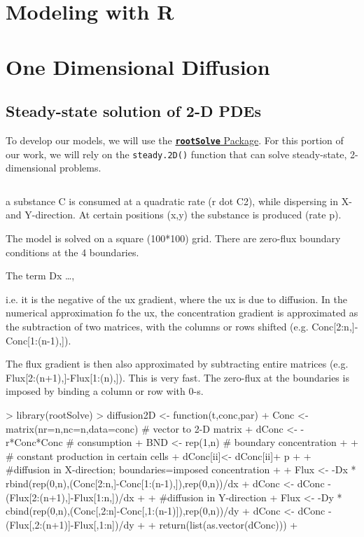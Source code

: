 \documentclass{article}
\begin{document}
\section{Modeling with R}

\section{One Dimensional Diffusion}


\subsection{Steady-state solution of 2-D PDEs}

To develop our models, we will use the \href{https://cran.r-project.org/web/packages/rootSolve/vignettes/rootSolve.pdf}{\texttt{\textbf{rootSolve}} Package}. For this portion of our work, we will rely on the \texttt{steady.2D()} function that can solve steady-state, 2-dimensional problems.

\begin{equation}
\end{equation}

a substance C is consumed at a quadratic rate (r dot C2), while dispersing in X- and Y-direction.
At certain positions (x,y) the substance is produced (rate p).

The model is solved on a square (100*100) grid. There are zero-flux boundary conditions at
the 4 boundaries.

The term Dx \ldots, 

i.e. it is the negative of the 
ux gradient, where the ux is due to diffusion. In the numerical approximation fo the 
ux, the concentration gradient is approximated as the subtraction of two matrices, with the columns or rows shifted (e.g. Conc[2:n,]-Conc[1:(n-1),]).

The flux gradient is then also approximated by subtracting entire matrices (e.g. Flux[2:(n+1),]-Flux[1:(n),]). This is very fast. The zero-flux at the boundaries is imposed by binding a column or row with 0-s.


\begin{Schunk}
\begin{Sinput}
> library(rootSolve)
> diffusion2D <- function(t,conc,par){
+ Conc <- matrix(nr=n,nc=n,data=conc) # vector to 2-D matrix
+ dConc <- -r*Conc*Conc # consumption
+ BND <- rep(1,n) # boundary concentration
+ 
+ # constant production in certain cells
+ dConc[ii]<- dConc[ii]+ p
+ 
+ #diffusion in X-direction; boundaries=imposed concentration
+ 
+ Flux <- -Dx * rbind(rep(0,n),(Conc[2:n,]-Conc[1:(n-1),]),rep(0,n))/dx
+ dConc <- dConc - (Flux[2:(n+1),]-Flux[1:n,])/dx
+ 
+ #diffusion in Y-direction
+ Flux <- -Dy * cbind(rep(0,n),(Conc[,2:n]-Conc[,1:(n-1)]),rep(0,n))/dy
+ dConc <- dConc - (Flux[,2:(n+1)]-Flux[,1:n])/dy
+ 
+ return(list(as.vector(dConc)))
+ }
\end{Sinput}
\end{Schunk}
\end{document}
